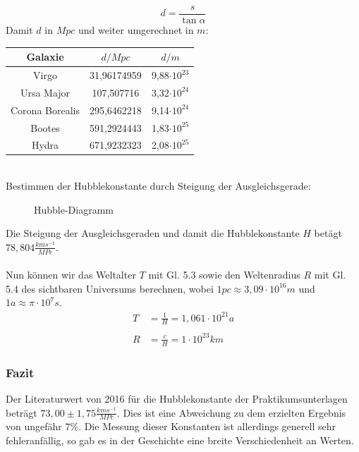 \documentclass[12pt]{article}
\begin{document}
\[d = \frac{s}{\tan \alpha}\]
Damit $d$ in $Mpc$ und weiter umgerechnet in $m$:
\begin{table}[!ht]
    \centering
    \begin{tabular}{c|c|c}
        Galaxie & $d / Mpc$ & $d /m$ \\ \hline
        Virgo & 31,96174959 & 9,88$\cdot 10^{23}$ \\ 
        Ursa Major & 107,507716 & 3,32$\cdot 10^{24}$ \\ 
        Corona Borealis & 295,6462218 & 9,14$\cdot 10^{24}$ \\ 
        Bootes & 591,2924443 & 1,83$\cdot 10^{25}$ \\ 
        Hydra & 671,9232323 & 2,08$\cdot 10^{25}$\\ 
    \end{tabular}
\end{table}\\
Bestimmen der Hubblekonstante durch Steigung der Ausgleichsgerade:
\begin{figure}[h!]
    \centering
{}
\caption[short]{Hubble-Diagramm}
\end{figure}
\newpage\noindent
Die Steigung der Ausgleichsgeraden und damit die Hubblekonstante $H$ betägt $78,804 \frac{kms^{-1}}{MPc}$.\\\\
Nun können wir das Weltalter $T$ mit Gl. 5.3 sowie den Weltenradius $R$ mit Gl. 5.4 des sichtbaren Universums berechnen, wobei $1pc \approx 3,09 \cdot 10^{16}m$ und $1a \approx \pi \cdot 10^7 s$.
\[\begin{aligned}
    T &= \frac{1}{H} = 1,061 \cdot 10^{21}a \\\\
    R &= \frac{c}{H} = 1 \cdot 10^{23} km
\end{aligned}\]
\subsubsection*{Fazit}
Der Literaturwert von 2016 für die Hubblekonstante der Praktikumsunterlagen beträgt $73,00 \pm 1,75 \frac{kms^{-1}}{MPc}$. Dies ist eine Abweichung zu dem erzielten Ergebnis von ungefähr $7 \%$. Die Messung dieser Konstanten ist allerdings generell sehr fehleranfällig, so gab es in der Geschichte eine breite Verschiedenheit an Werten.
\end{document}

